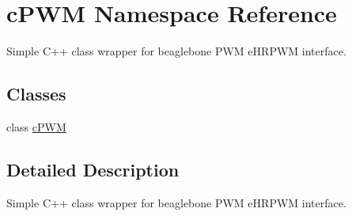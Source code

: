 \hypertarget{namespacec_p_w_m}{\section{c\-P\-W\-M \-Namespace \-Reference}
\label{namespacec_p_w_m}
}


\-Simple \-C++ class wrapper for beaglebone \-P\-W\-M e\-H\-R\-P\-W\-M interface.  


\subsection*{\-Classes}
\begin{DoxyCompactItemize}
\item 
class \hyperlink{classc_p_w_m_1_1c_p_w_m}{c\-P\-W\-M}
\end{DoxyCompactItemize}


\subsection{\-Detailed \-Description}
\-Simple \-C++ class wrapper for beaglebone \-P\-W\-M e\-H\-R\-P\-W\-M interface. 